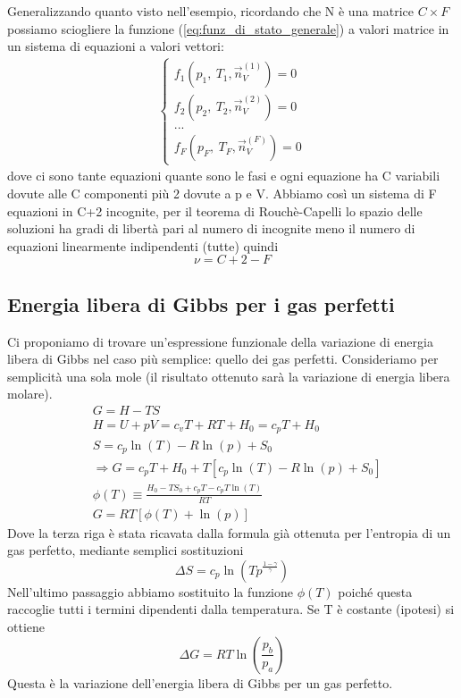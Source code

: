 \documentclass[
10pt, %
a4paper, %
oneside, %
headinclude,footinclude, %
BCOR5mm, %
]{scrartcl}
\begin{document}
Generalizzando quanto visto nell'esempio, ricordando che N è una matrice \(C \times F\) possiamo sciogliere la funzione (\ref{eq:funz_di_stato_generale}) a valori matrice in un sistema di equazioni a valori vettori:
\begin{align*}
	\begin{cases}
		f_1(p_1,\ T_1, \vec{n}_V^{(1)})=0\\
		f_2(p_2,\ T_2, \vec{n}_V^{(2)})=0\\
		...\\
		f_F(p_F,\ T_F, \vec{n}_V^{(F)})=0
	\end{cases}
\end{align*}
dove ci sono tante equazioni quante sono le fasi e ogni equazione ha C variabili dovute alle C componenti più 2 dovute a p e V. Abbiamo così un sistema di F equazioni in C+2 incognite, per il teorema di Rouchè-Capelli lo spazio delle soluzioni ha gradi di libertà pari al numero di incognite meno il numero di equazioni linearmente indipendenti (tutte) quindi
\[\nu = C+2-F\]
\subsection{Energia libera di Gibbs per i gas perfetti}
Ci proponiamo di trovare un'espressione funzionale della variazione di energia libera di Gibbs nel caso più semplice: quello dei gas perfetti. Consideriamo per semplicità una sola mole (il risultato ottenuto sarà la variazione di energia libera molare).
\begin{align*}
	&G = H-TS\\
	&H=U+pV=c_v T + RT + H_0 = c_p T +H_0\\
	&S=c_p\ln(T)-R\ln(p)+S_0\\
	&\Rightarrow G = c_p T+H_0+T[c_p\ln(T)-R\ln(p)+S_0]\\
	&\phi(T) \equiv \frac{H_0-TS_0+c_pT-c_pT\ln(T)}{RT}\\
	&G=RT[\phi(T)+\ln(p)]
\end{align*} 
Dove la terza riga è stata ricavata dalla formula già ottenuta per l'entropia di un gas perfetto, mediante semplici sostituzioni
\[\Delta S = c_p\ln(Tp^{\frac{1-\gamma}{\gamma}})\]
Nell'ultimo passaggio abbiamo sostituito la funzione $\phi(T)$ poiché questa raccoglie tutti i termini dipendenti dalla temperatura. Se T è costante (ipotesi) si ottiene
\[\Delta G = RT\ln\left(\frac{p_b}{p_a}\right)\]
Questa è la variazione dell'energia libera di Gibbs per un gas perfetto.\\
\end{document}
